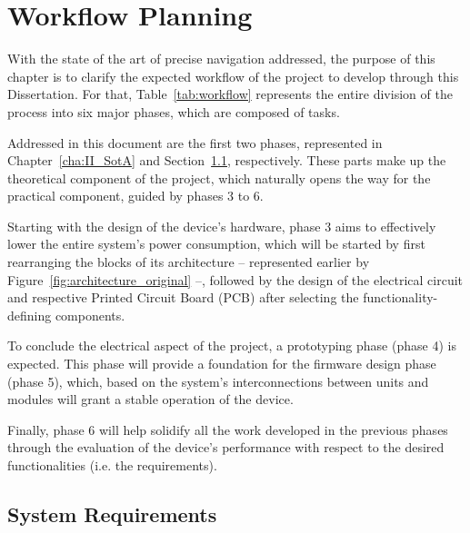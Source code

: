 

\chapter{Workflow Planning}\label{cha:III_workflow}

With the state of the art of precise navigation addressed, the purpose of this chapter is to clarify the expected workflow of the project to develop through this Dissertation. For that, Table~\ref{tab:workflow} represents the entire division of the process into six major phases, which are composed of tasks.

Addressed in this document are the first two phases, represented in Chapter~\ref{cha:II_SotA} and Section~\ref{sec:III_requirements}, respectively. These parts make up the theoretical component of the project, which naturally opens the way for the practical component, guided by phases 3 to 6.

Starting with the design of the device's hardware, phase 3 aims to effectively lower the entire system's power consumption, which will be started by first rearranging the blocks of its architecture -- represented earlier by Figure~\ref{fig:architecture_original} --, followed by the design of the electrical circuit and respective Printed Circuit Board (PCB) after selecting the functionality-defining components.

To conclude the electrical aspect of the project, a prototyping phase (phase 4) is expected. This phase will provide a foundation for the firmware design phase (phase 5), which, based on the system's interconnections between units and modules will grant a stable operation of the device.

Finally, phase 6 will help solidify all the work developed in the previous phases through the evaluation of the device's performance with respect to the desired functionalities (i.e. the requirements).

\section{System Requirements}\label{sec:III_requirements}

